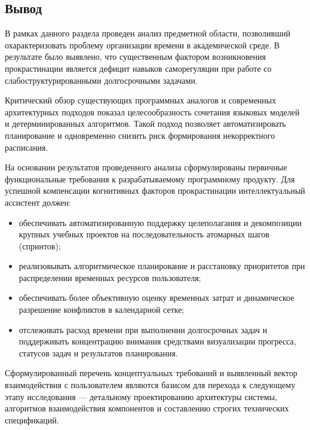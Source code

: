 \subsection{Вывод}

В рамках данного раздела проведен анализ предметной области, позволивший охарактеризовать проблему организации времени в академической среде. В результате было выявлено, что существенным фактором возникновения прокрастинации является дефицит навыков саморегуляции при работе со слабоструктурированными долгосрочными задачами.

Критический обзор существующих программных аналогов и современных архитектурных подходов показал целесообразность сочетания языковых моделей и детерминированных алгоритмов. Такой подход позволяет автоматизировать планирование и одновременно снизить риск формирования некорректного расписания.

На основании результатов проведенного анализа сформулированы первичные функциональные требования к разрабатываемому программному продукту. Для успешной компенсации когнитивных факторов прокрастинации интеллектуальный ассистент должен:
\begin{itemize}
    \item обеспечивать автоматизированную поддержку целеполагания и декомпозиции крупных учебных проектов на последовательность атомарных шагов (спринтов);
    \item реализовывать алгоритмическое планирование и расстановку приоритетов при распределении временных ресурсов пользователя;
    \item обеспечивать более объективную оценку временных затрат и динамическое разрешение конфликтов в календарной сетке;
    \item отслеживать расход времени при выполнении долгосрочных задач и поддерживать концентрацию внимания средствами визуализации прогресса, статусов задач и результатов планирования.
\end{itemize}

Сформулированный перечень концептуальных требований и выявленный вектор взаимодействия с пользователем являются базисом для перехода к следующему этапу исследования — детальному проектированию архитектуры системы, алгоритмов взаимодействия компонентов и составлению строгих технических спецификаций.
